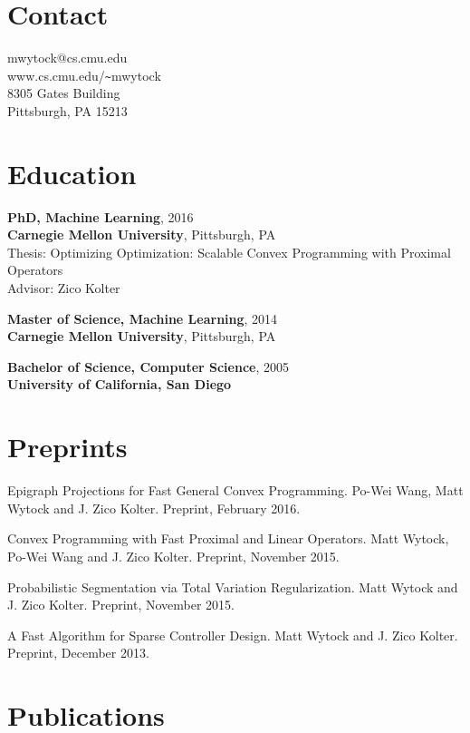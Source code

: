 \documentclass[margin, line]{res}
\begin{document}
\renewcommand{\namefont}{\Huge\bf}


\begin{resume}
\section{Contact}
mwytock@cs.cmu.edu \\
www.cs.cmu.edu/\verb+~+mwytock \\
8305 Gates Building \\
Pittsburgh, PA 15213

\section{Education}

{\bf PhD, Machine Learning}, 2016 \\
{\bf Carnegie Mellon University}, Pittsburgh, PA \\
Thesis: Optimizing Optimization: Scalable Convex Programming with Proximal Operators \\
Advisor: Zico Kolter

{\bf Master of Science, Machine Learning}, 2014 \\
{\bf Carnegie Mellon University}, Pittsburgh, PA

{\bf Bachelor of Science, Computer Science}, 2005 \\
{\bf University of California, San Diego}

\section{Preprints}

Epigraph Projections for Fast General Convex Programming. Po-Wei Wang, Matt
Wytock and J. Zico Kolter. Preprint, February 2016.

Convex Programming with Fast Proximal and Linear Operators. Matt Wytock, Po-Wei
Wang and J. Zico Kolter. Preprint, November 2015.

Probabilistic Segmentation via Total Variation Regularization. Matt Wytock and
J. Zico Kolter. Preprint, November 2015.

A Fast Algorithm for Sparse Controller Design. Matt Wytock and J. Zico
Kolter. Preprint, December 2013.

\section{Publications}


\end{resume}
\end{document}
